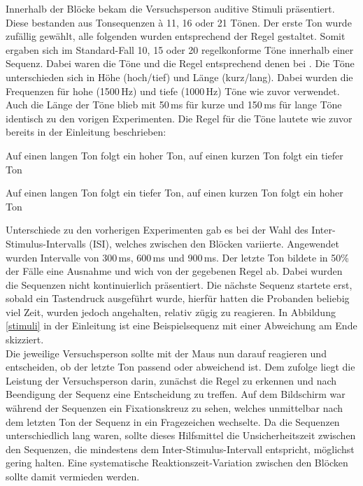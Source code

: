 \documentclass[doc,a4paper,12pt]{apa6}
\begin{document}
Innerhalb der Blöcke bekam die Versuchsperson auditive Stimuli präsentiert. Diese bestanden aus Tonsequenzen à 11, 16 oder 21 Tönen. Der erste Ton wurde zufällig gewählt, alle folgenden wurden entsprechend der Regel gestaltet. Somit ergaben sich im Standard-Fall 10, 15 oder 20 regelkonforme Töne innerhalb einer Sequenz. Dabei waren die Töne und die Regel entsprechend denen bei \textcite{paavilainen2007preattentive}. Die Töne unterschieden sich in Höhe (hoch/tief) und Länge (kurz/lang). Dabei wurden die Frequenzen für hohe (1500\,Hz) und tiefe (1000\,Hz) Töne wie zuvor verwendet. Auch die Länge der Töne blieb mit 50\,ms für kurze und 150\,ms für lange Töne identisch zu den vorigen Experimenten. Die Regel für die Töne lautete wie zuvor bereits in der Einleitung beschrieben:

\begin{compactitem}
  \item Auf einen langen Ton folgt ein hoher Ton, auf einen kurzen Ton folgt ein tiefer
Ton
  \item Auf einen langen Ton folgt ein tiefer Ton, auf einen kurzen Ton folgt ein hoher
Ton
\end{compactitem}

Unterschiede zu den vorherigen Experimenten gab es bei der Wahl des Inter-Stimulus-Intervalls (ISI), welches zwischen den Blöcken variierte. Angewendet wurden Intervalle von 300\,ms, 600\,ms und 900\,ms. Der letzte Ton bildete in 50\% der Fälle eine Ausnahme und wich von der gegebenen Regel ab. Dabei wurden die Sequenzen nicht kontinuierlich präsentiert. Die nächste Sequenz startete erst, sobald ein Tastendruck ausgeführt wurde, hierfür hatten die Probanden beliebig viel Zeit, wurden jedoch angehalten, relativ zügig zu reagieren. In Abbildung \ref{stimuli} in der Einleitung ist eine Beispielsequenz mit einer Abweichung am Ende skizziert.\\
Die jeweilige Versuchsperson sollte mit der Maus nun darauf reagieren und entscheiden, ob der letzte Ton passend oder abweichend ist. Dem zufolge liegt die Leistung der Versuchsperson darin, zunächst die Regel zu erkennen und nach Beendigung der Sequenz eine Entscheidung zu treffen. Auf dem Bildschirm war während der Sequenzen ein Fixationskreuz zu sehen, welches unmittelbar nach dem letzten Ton der Sequenz in ein Fragezeichen wechselte. Da die Sequenzen unterschiedlich lang waren, sollte dieses Hilfsmittel die Unsicherheitszeit zwischen den Sequenzen, die mindestens dem Inter-Stimulus-Intervall entspricht, möglichst gering halten. Eine systematische Reaktionszeit-Variation zwischen den Blöcken sollte damit vermieden werden.
\end{document}
